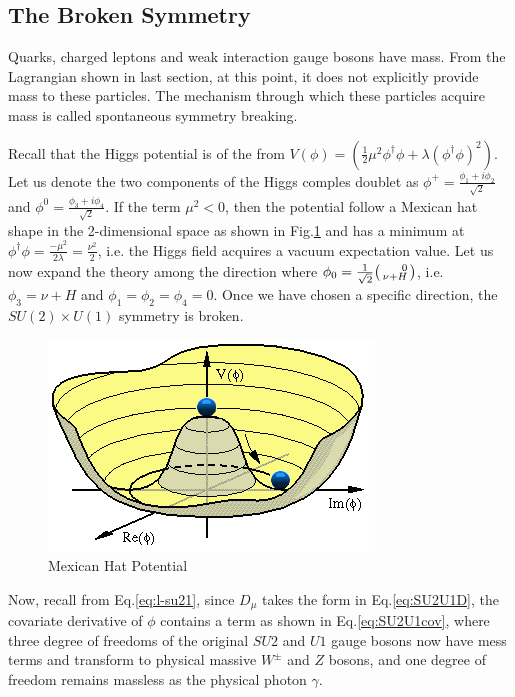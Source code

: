 \label{sec:theory-higgs}
\subsection{The Broken Symmetry}

Quarks, charged leptons and weak interaction gauge bosons have mass. From the Lagrangian shown in last section, at this point, it does not explicitly provide mass to these particles. The mechanism through which these particles acquire mass is called spontaneous symmetry breaking.

Recall that the Higgs potential is of the from $V(\phi)=(\frac{1}{2}\mu^2\phi^{\dagger}\phi+\lambda(\phi^{\dagger}\phi )^2)$. Let us denote the two components of the Higgs comples doublet as $\phi^+ = \frac{\phi_1+i\phi_2}{\sqrt{2}}$ and $\phi^0 = \frac{\phi_3+i\phi_4}{\sqrt{2}}$. If the term $\mu^2<0$, then the potential follow a Mexican hat shape in the 2-dimensional space as shown in Fig.\ref{fig:theory-mexican} and has a minimum at $\phi^{\dagger}\phi = \frac{-\mu^2}{2\lambda} = \frac{\nu^2}{2}$, i.e. the Higgs field acquires a vacuum expectation value. Let us now expand the theory among the direction where $\phi_0 = \frac{1}{\sqrt{2}}\begin{psmallmatrix*}[r]0\\ \nu+H \end{psmallmatrix*}$, i.e. $\phi_3=\nu+H$ and  $\phi_1=\phi_2=\phi_4 = 0$. Once we have chosen a specific direction, the $SU(2)\times U(1)$ symmetry is broken.


\begin{figure}[htpb!]
\begin{center}
  \includegraphics[width=0.45\linewidth]{figures/theory/MexicanHat.png}
\caption{Mexican Hat Potential}
\label{fig:theory-mexican}
\end{center}
\end{figure}


Now, recall from Eq.\ref{eq:l-su21}, since $D_{\mu}$ takes the form in Eq.\ref{eq:SU2U1D}, the covariate derivative of $\phi$ contains a term as shown in Eq.\ref{eq:SU2U1cov}, where three degree of freedoms of the original $SU2$ and $U1$ gauge bosons now have mess terms and transform to physical massive $W^{\pm}$ and $Z$ bosons, and one degree of freedom remains massless as the physical photon $\gamma$. 

